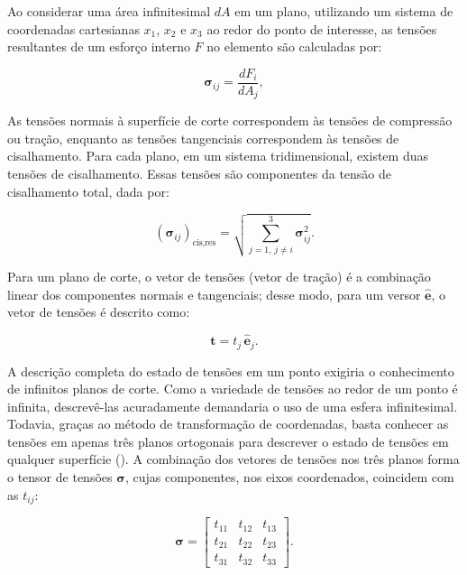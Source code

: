 	\indent Ao considerar uma área infinitesimal $dA$ em um plano, utilizando um sistema de coordenadas cartesianas \(x_1\), \(x_2\) e \(x_3\) ao redor do ponto de interesse, as tensões resultantes de um esforço interno $F$ no elemento são calculadas por: 

    \begin{equation}
        \boldsymbol{\sigma}_{ij}  = \frac{dF_{i}}{dA_j}, 
        \label{eq:3.10}
    \end{equation}


	\indent As tensões normais à superfície de corte correspondem às tensões de compressão ou tração, enquanto as tensões tangenciais correspondem às tensões de cisalhamento. Para cada plano, em um sistema tridimensional, existem duas tensões de cisalhamento. Essas tensões são componentes da tensão de cisalhamento total, dada por: 

    \begin{equation}
        (\boldsymbol{\sigma}_{ij})_{\text{cis,res}} = \sqrt{ \sum_{j=1,\, j \neq i}^{3} \boldsymbol{\sigma}_{ij}^2 }.
        \label{eq:3.11}
    \end{equation}


    \indent Para um plano de corte, o vetor de tensões (vetor de tração) é a combinação linear dos componentes normais e tangenciais; desse modo, para um versor $\hat{\mathbf{e}}$, o vetor de tensões é descrito como: 

    \begin{equation}
        \mathbf{t} = t_j \,\hat{\mathbf{e}}_j .
        \label{eq:3.12}
    \end{equation}


\indent A descrição completa do estado de tensões em um ponto exigiria o conhecimento de infinitos planos de corte. Como a variedade de tensões ao redor de um ponto é infinita, descrevê-las acuradamente demandaria o uso de uma esfera infinitesimal. Todavia, graças ao método de transformação de coordenadas, basta conhecer as tensões em apenas três planos ortogonais para descrever o estado de tensões em qualquer superfície (\citet{roarksformulasstressstrainninthedition2020}). A combinação dos vetores de tensões nos três planos forma o tensor de tensões \(\boldsymbol{\sigma}\), cujas componentes, nos eixos coordenados, coincidem com as \(t_{ij}\):

    \begin{equation}
    \boldsymbol{\sigma} = \begin{bmatrix} 
        t_{11} & t_{12} & t_{13} \\ 
        t_{21} & t_{22} & t_{23} \\ 
        t_{31} & t_{32} & t_{33}  
    \end{bmatrix}.
    \label{eq:3.13}
    \end{equation}


